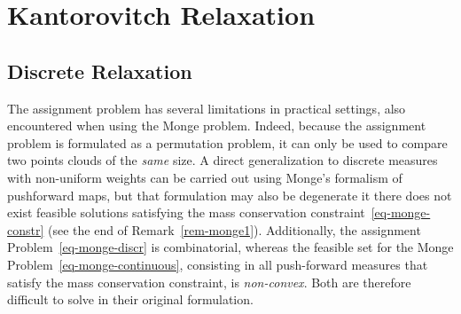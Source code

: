 
\section{Kantorovitch Relaxation}

\subsection{Discrete Relaxation}

The assignment problem has several limitations in practical settings, also encountered when using the Monge problem. Indeed, because the assignment problem is formulated as a permutation problem, it can only be used to compare two points clouds of the \emph{same} size. A direct generalization to discrete measures with non-uniform weights can be carried out using Monge's formalism of pushforward maps, but that formulation may also be degenerate it there does not exist feasible solutions satisfying the mass conservation constraint~\eqref{eq-monge-constr} (see the end of Remark~\ref{rem-monge1}). Additionally, the assignment Problem~\eqref{eq-monge-discr} is combinatorial, whereas the feasible set for the Monge Problem~\eqref{eq-monge-continuous}, consisting in all push-forward measures that satisfy the mass conservation constraint, is \emph{non-convex}. Both are therefore difficult to solve in their original formulation.


